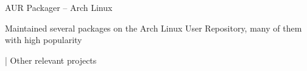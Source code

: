 \begin{cventries}
  \cventry
    {AUR Packager --
    \href{https://aur.archlinux.org/packages/?SeB=m&K=ljmf00}{\faLink\acvHeaderIconSep\@Packages}} %
    {Arch Linux} %
    {} %
    {} %
    {
      \begin{cvitems} %
        \item {Maintained several packages on the Arch Linux User Repository, many of them with high popularity}
      \end{cvitems}
    }

  \cventry
    {\href{https://github.com/pulls?q=is\%3Apr+author\%3Aljmf00+archived\%3Afalse+is\%3Aclosed}{\faGithubSquare\acvHeaderIconSep\@Contributions} | \href{https://www.lsferreira.net/projects/}{\faLink\acvHeaderIconSep\@Projects}} %
    {Other relevant projects} %
    {} %
    {} %
    {}

\end{cventries}
